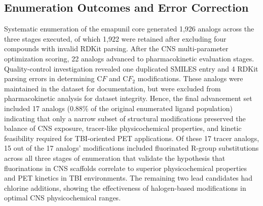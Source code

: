 \documentclass[times, twoside]{zHenriquesLab-StyleBioRxiv}
\begin{document}
		\subsection*{Enumeration Outcomes and Error Correction}
		Systematic enumeration of the emapunil core generated 1,926 analogs across the three stages executed, of which 1,922 were retained after excluding four compounds with invalid RDKit parsing. After the CNS multi-parameter optimization scoring, 22 analogs advanced to pharmacokinetic evaluation stages. Quality-control investigation revealed one duplicated SMILES entry and 4 RDKit parsing errors in determining $\mathrm{C}{F}$ and $\mathrm{C}{F}_2$ modifications. These analogs were maintained in the dataset for documentation, but were excluded from pharmacokinetic analysis for dataset integrity. Hence, the final advancement set included 17 analogs (0.88\% of the original enumerated ligand population) indicating that only a narrow subset of structural modifications preserved the balance of CNS exposure, tracer-like physicochemical properties, and kinetic feasibility required for TBI-oriented PET applications. Of these 17 tracer analogs, 15 out of the 17 analogs’ modifications included fluorinated R-group substitutions across all three stages of enumeration that validate the hypothesis that fluorinations in CNS scaffolds correlate to superior physicochemical properties and PET kinetics in TBI environments. The remaining two lead candidates had chlorine additions, showing the effectiveness of halogen-based modifications in optimal CNS physicochemical ranges.
		
\end{document}
